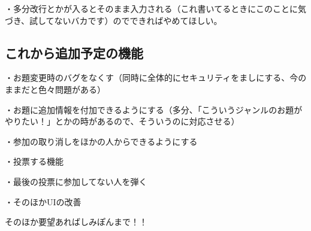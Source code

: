 \documentclass{jsarticle}
\begin{document}
・多分改行とかが入るとそのまま入力される（これ書いてるときにこのことに気づき、試してないバカです）のでできればやめてほしい。

\subsection{これから追加予定の機能}
・お題変更時のバグをなくす（同時に全体的にセキュリティをましにする、今のままだと色々問題がある）

・お題に追加情報を付加できるようにする（多分、「こういうジャンルのお題がやりたい！」とかの時があるので、そういうのに対応させる）

・参加の取り消しをほかの人からできるようにする

・投票する機能

・最後の投票に参加してない人を弾く

・そのほかUIの改善

そのほか要望あればしみぽんまで！！
\end{document}
